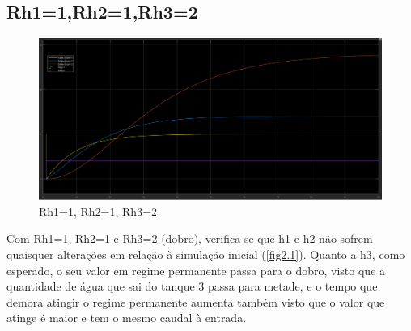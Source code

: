 \documentclass[11pt]{article}
\begin{document}
\pagebreak
\subsection{Rh1=1,Rh2=1,Rh3=2}
\begin{figure}[!h]
\includegraphics[width=16cm]{rh3.png}
\caption{Rh1=1, Rh2=1, Rh3=2}
\label{fig2.4}
\end{figure}
Com Rh1=1, Rh2=1 e Rh3=2 (dobro), verifica-se que h1 e h2 não sofrem quaisquer alterações em relação à simulação inicial (\ref{fig2.1}). Quanto a h3, como esperado, o seu valor em regime permanente passa para o dobro, visto que a quantidade de água que sai do tanque 3 passa para metade, e o tempo que demora atingir o regime permanente aumenta também visto que o valor que atinge é maior e tem o mesmo caudal à entrada.
\end{document}
